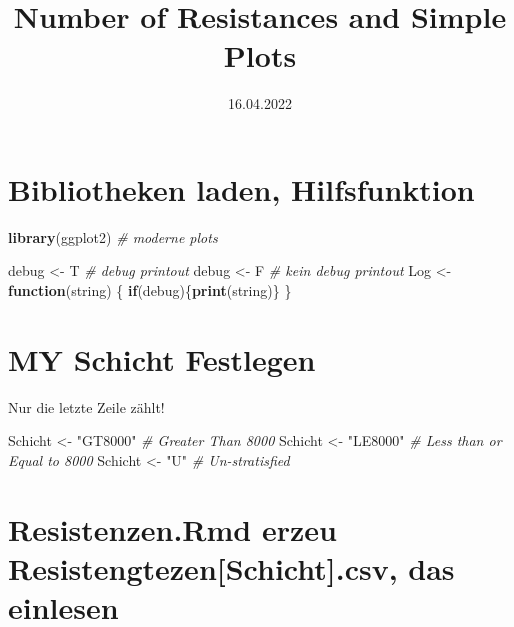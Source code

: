 \documentclass[
]{article}
\title{Number of Resistances and Simple Plots}
\author{}
\date{\vspace{-2.5em}16.04.2022}
\newenvironment{Shaded}{\begin{snugshade}}{\end{snugshade}}
\newcommand{\CommentTok}[1]{\textcolor[rgb]{0.56,0.35,0.01}{\textit{#1}}}
\newcommand{\ControlFlowTok}[1]{\textcolor[rgb]{0.13,0.29,0.53}{\textbf{#1}}}
\newcommand{\KeywordTok}[1]{\textcolor[rgb]{0.13,0.29,0.53}{\textbf{#1}}}
\newcommand{\NormalTok}[1]{#1}
\newcommand{\StringTok}[1]{\textcolor[rgb]{0.31,0.60,0.02}{#1}}
\begin{document}
\maketitle

\hypertarget{bibliotheken-laden-hilfsfunktion}{%
\section{Bibliotheken laden,
Hilfsfunktion}\label{bibliotheken-laden-hilfsfunktion}}

\begin{Shaded}
\begin{Highlighting}[]
\KeywordTok{library}\NormalTok{(ggplot2)     }\CommentTok{# moderne plots}

\NormalTok{debug <-}\StringTok{ }\NormalTok{T           }\CommentTok{# debug printout}
\NormalTok{debug <-}\StringTok{ }\NormalTok{F           }\CommentTok{# kein debug printout}
\NormalTok{Log <-}\StringTok{ }\ControlFlowTok{function}\NormalTok{(string) \{}
  \ControlFlowTok{if}\NormalTok{(debug)\{}\KeywordTok{print}\NormalTok{(string)\}  }
\NormalTok{\}}
\end{Highlighting}
\end{Shaded}

\hypertarget{my-schicht-festlegen}{%
\section{MY Schicht Festlegen}\label{my-schicht-festlegen}}

Nur die letzte Zeile zählt!

\begin{Shaded}
\begin{Highlighting}[]
\NormalTok{Schicht <-}\StringTok{ "GT8000"}    \CommentTok{# Greater Than 8000}
\NormalTok{Schicht <-}\StringTok{ "LE8000"}    \CommentTok{# Less than or Equal to 8000}
\NormalTok{Schicht <-}\StringTok{ "U"}         \CommentTok{# Un-stratisfied}
\end{Highlighting}
\end{Shaded}

\hypertarget{resistenzen.rmd-erzeu-resistengtezenschicht.csv-das-einlesen}{%
\section{Resistenzen.Rmd erzeu Resistengtezen{[}Schicht{]}.csv, das
einlesen}\label{resistenzen.rmd-erzeu-resistengtezenschicht.csv-das-einlesen}}
\end{document}
